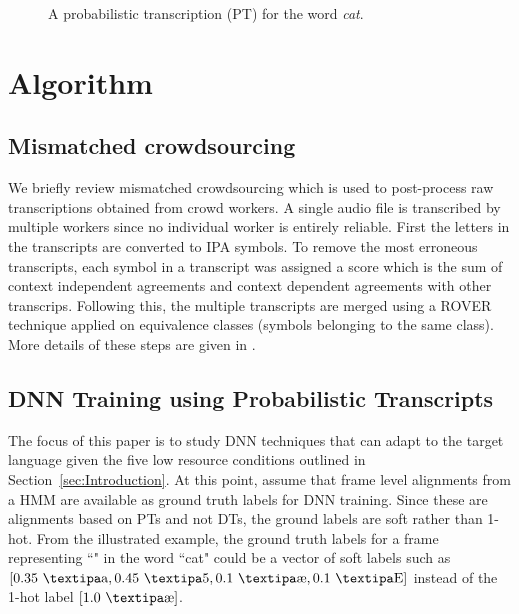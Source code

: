 \documentclass[a4paper]{article}
\newcommand{\mytikzscale}{0.8}
\newcommand{\myvspacefig}{\vspace{-4mm}}
\begin{document}
\begin{figure}
\begin{subfigure}
  \myvspacefig
  \caption{A probabilistic transcription (PT) for the word \emph{cat}.}
  \label{fig:pt}
  \end{subfigure}%
  \vspace{-7mm}
\end{figure}
\vspace{-3mm}
\section{Algorithm}
\label{sec:Algorithm}
\subsection{Mismatched crowdsourcing}  \vspace{-1mm}
We briefly review mismatched crowdsourcing which is used to post-process raw transcriptions obtained from crowd workers. A single audio file is transcribed by multiple workers since no individual worker is entirely reliable. First the letters in the transcripts are converted to IPA symbols. To remove the most erroneous transcripts, each symbol in a transcript was assigned a score which is the sum of context independent agreements and context dependent agreements with other transcrips. Following this, the multiple transcripts are merged using a ROVER technique applied on equivalence classes (symbols belonging to the same class). More details of these steps are given in \cite{Jyothi-MismatchedCrowdsourcingTrans}.

\subsection{DNN Training using Probabilistic Transcripts}  \vspace{-1mm}
\label{sec:DNN Training using Probabilistic Transcripts}
The focus of this paper is to study DNN techniques that can adapt to the target language given the five low resource conditions outlined in Section~\ref{sec:Introduction}. At this point, assume that frame level alignments from a HMM are available as ground truth labels for DNN training. Since these are alignments based on PTs and not DTs, the ground labels are soft rather than 1-hot. From the illustrated example, the ground truth labels for a frame representing ``\ipa{\ae}" in the word ``cat" could be a vector of soft labels such as $[0.35 \ \text{\ipa{a}}, 0.45 \ \text{\ipa{5}},  0.1 \ \text{\ipa{\ae}}, 0.1 \ \text{\ipa{E}}]$ instead of the 1-hot label $[1.0 \ \text{\ipa{\ae}}]$.
\end{document}
